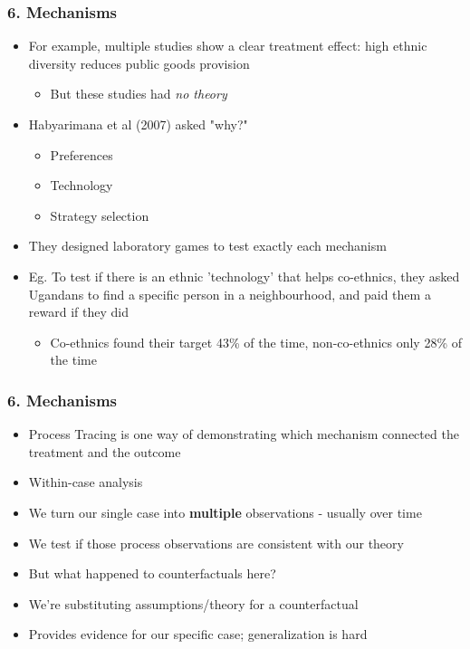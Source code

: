 \documentclass[xcolor=x11names,compress]{beamer}\usepackage[]{graphicx}\usepackage[]{color}
\renewcommand{\(}{\begin{columns}}
\renewcommand{\)}{\end{columns}}
\newcommand{\<}[1]{\begin{column}{#1}}
\renewcommand{\>}{\end{column}}
\begin{document}
\begin{frame}
\frametitle{6. Mechanisms}
\begin{itemize}
\item For example, multiple studies show a clear treatment effect: high ethnic diversity reduces public goods provision
\pause
\begin{itemize}
\item But these studies had \textit{no theory}
\pause
\end{itemize}
\item Habyarimana et al (2007) asked "why?"
\pause
\begin{itemize}
\item Preferences
\item Technology
\item Strategy selection
\pause
\end{itemize}
\item They designed laboratory games to test exactly each mechanism
\pause
\item Eg. To test if there is an ethnic 'technology' that helps co-ethnics, they asked Ugandans to find a specific person in a neighbourhood, and paid them a reward if they did
\pause
\begin{itemize}
\item Co-ethnics found their target 43\% of the time, non-co-ethnics only 28\% of the time
\end{itemize}
\end{itemize}
\end{frame}

\begin{frame}
\frametitle{6. Mechanisms}
\begin{itemize}
\item Process Tracing is one way of demonstrating which mechanism connected the treatment and the outcome 
\pause
\item Within-case analysis
\pause
\item We turn our single case into \textbf{multiple} observations - usually over time
\pause
\item We test if those process observations are consistent with our theory
\pause
\item But what happened to counterfactuals here? 
\pause
\item We're substituting assumptions/theory for a counterfactual
\pause
\item Provides evidence for our specific case; generalization is hard
\end{itemize}
\end{frame}
\end{document}
